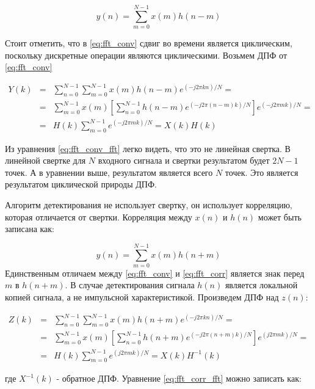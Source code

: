 \begin{equation}
	\label{eq:fft_conv}
	y(n)=\sum\limits_{m=0}^{N-1}{x(m)h(n-m)}
\end{equation}

Стоит отметить, что в \ref{eq:fft_conv} сдвиг во времени является циклическим, поскольку дискретные операции являются циклическими.
Возьмем ДПФ от \ref{eq:fft_conv}

\begin{center}
\begin{eqnarray}
	\label{eq:fft_conv_fft}
	Y(k) & = & \sum\limits_{n=0}^{N-1}\sum\limits_{m=0}^{N-1}{x(m)h(n-m)e^{(-j2\pi{kn})/N}}=\nonumber \\
	& = & \sum\limits_{m=0}^{N-1}{x(m)}[\sum\limits_{n=0}^{N-1}h(n-m)e^{(-j2\pi{(n-m)}k)/N}]e^{(-j2\pi{m}k)/N}=\\
	& = & H(k)\sum\limits_{m=0}^{N-1}e^{(-j2\pi{m}k)/N} = X(k)H(k)\nonumber 
\end{eqnarray}
\end{center}


Из уравнения \ref{eq:fft_conv_fft} легко видеть, что это не линейная свертка. В линейной свертке для $N$ входного
сигнала и свертки результатом будет $2N-1$ точек. А в уравнении выше, результатом является всего $N$ точек.
Это является результатом циклической природы ДПФ.

Алгоритм детектирования не использует свертку, он использует корреляцию, которая отличается от свертки. Корреляция
между $x(n)$ и $h(n)$ может быть записана как:

\begin{equation}
	\label{eq:fft_corr}
	y(n) = \sum\limits_{m=0}^{N-1}{x(m)h(n+m)}
\end{equation}
Единственным отличаем между \ref{eq:fft_conv} и \ref{eq:fft_corr} является знак перед $m$ в ${h(n+m)}$.
В случае детектирования сигнала $h(n)$ является локальной копией сигнала, а не импульсной характеристикой.
Произведем ДПФ над $z(n)$:

\begin{center}
\begin{eqnarray}
	\label{eq:fft_corr_fft}
	Z(k) & = & \sum\limits_{n=0}^{N-1}\sum\limits_{m=0}^{N-1}{x(m)h(n+m)e^{(-j2\pi{kn})/N}}=\nonumber \\
	& = & \sum\limits_{m=0}^{N-1}{x(m)}[\sum\limits_{n=0}^{N-1}h(n+m)e^{(-j2\pi{(n+m)}k)/N}]e^{(j2\pi{m}k)/N}=\\
	& = & H(k)\sum\limits_{m=0}^{N-1}e^{(j2\pi{m}k)/N} = X(k)H^{-1}(k)\nonumber 
\end{eqnarray}
\end{center}
где ${X^{-1}(k)}$ - обратное ДПФ. Уравнение \ref{eq:fft_corr_fft} можно записать как:

